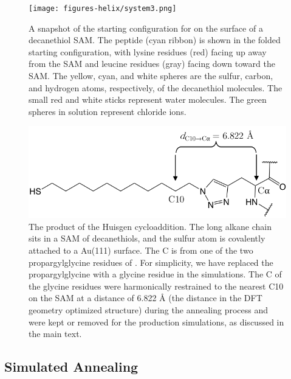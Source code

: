 \begin{figure}
    \center
    \texttt{[image: figures-helix/system3.png]}
    \caption[Starting configuration of \pep{} on the surface of a SAM]{
        A snapshot of the starting configuration for \pep{} on the surface of a decanethiol SAM. 
        The peptide (cyan ribbon) is shown in the folded starting configuration, with lysine residues (red) facing up away from the SAM and leucine residues (gray) facing down toward the SAM. 
        The yellow, cyan, and white spheres are the sulfur, carbon, and hydrogen atoms, respectively, of the decanethiol molecules. 
        The small red and white sticks represent water molecules. 
        The green spheres in solution represent chloride ions. 
    }
    \label{fig:helix-system}
\end{figure}

\begin{figure}
    \center
    \includegraphics[width=\double]{figures-helix/Linker_figure.png}
    \caption[The product of the Huisgen cycloaddition]{
        The product of the Huisgen cycloaddition. 
        The long alkane chain sits in a SAM of decanethiols, and the sulfur atom is covalently attached to a Au(111) surface. 
        The C\textalpha{} is from one of the two propargylglycine residues of \pep{}. 
        For simplicity, we have replaced the propargylglycine with a glycine residue in the simulations. 
        The C\textalpha{} of the glycine residues were harmonically restrained to the nearest C10 on the SAM at a distance of 6.822 \si{\angstrom} (the distance in the DFT geometry optimized structure) during the annealing process and were kept or removed for the production simulations, as discussed in the main text.
    }
    \label{fig:helix-linker}
\end{figure}

\subsection{Simulated Annealing}\label{helix-anneal}

